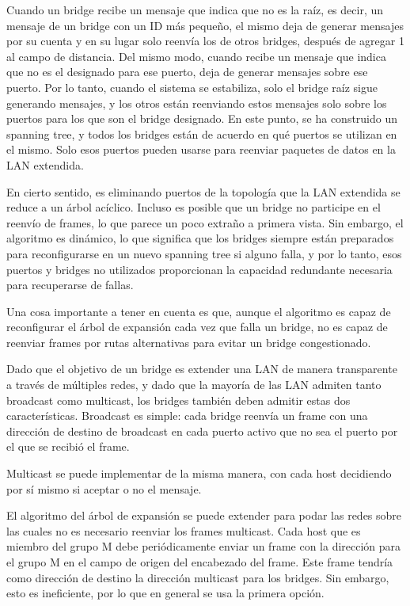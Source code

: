 Cuando un bridge recibe un mensaje que indica que no es la raíz, es decir, un mensaje de un bridge con un ID más pequeño, el mismo deja de generar mensajes por su cuenta y en su lugar solo reenvía los de otros bridges, después de agregar 1 al campo de distancia. Del mismo modo, cuando recibe un mensaje que indica que no es el designado para ese puerto, deja de generar mensajes sobre ese puerto. Por lo tanto, cuando el sistema se estabiliza, solo el bridge raíz sigue generando mensajes, y los otros están reenviando estos mensajes solo sobre los puertos para los que son el bridge designado. En este punto, se ha construido un spanning tree, y todos los bridges están de acuerdo en qué puertos se utilizan en el mismo. Solo esos puertos pueden usarse para reenviar paquetes de datos en la LAN extendida.

En cierto sentido, es eliminando puertos de la topología que la LAN extendida se reduce a un árbol acíclico. Incluso es posible que un bridge no participe en el reenvío de frames, lo que parece un poco extraño a primera vista. Sin embargo, el algoritmo es dinámico, lo que significa que los bridges siempre están preparados para reconfigurarse en un nuevo spanning tree si alguno falla, y por lo tanto, esos puertos y bridges no utilizados proporcionan la capacidad redundante necesaria para recuperarse de fallas.

Una cosa importante a tener en cuenta es que, aunque el algoritmo es capaz de reconfigurar el árbol de expansión cada vez que falla un bridge, no es capaz de reenviar frames por rutas alternativas para evitar un bridge congestionado.

Dado que el objetivo de un bridge es extender una LAN de manera transparente a través de múltiples redes, y dado que la mayoría de las LAN admiten tanto broadcast como multicast, los bridges también deben admitir estas dos características. Broadcast es simple: cada bridge reenvía un frame con una dirección de destino de broadcast en cada puerto activo que no sea el puerto por el que se recibió el frame.

Multicast se puede implementar de la misma manera, con cada host decidiendo por sí mismo si aceptar o no el mensaje.

El algoritmo del árbol de expansión se puede extender para podar las redes sobre las cuales no es necesario reenviar los frames multicast. Cada host que es miembro del grupo M debe periódicamente enviar un frame con la dirección para el grupo M en el campo de origen del encabezado del frame. Este frame tendría como dirección de destino la dirección multicast para los bridges. Sin embargo, esto es ineficiente, por lo que en general se usa la primera opción.

